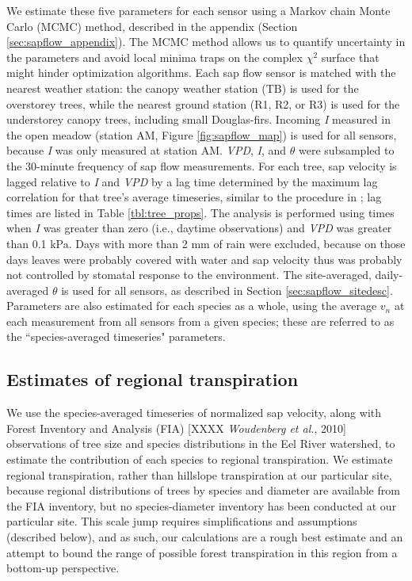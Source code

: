 We estimate these five parameters for each sensor using a Markov chain Monte Carlo (MCMC) method, described in the appendix (Section \ref{sec:sapflow_appendix}).  The MCMC method allows us to quantify uncertainty in the parameters and avoid local minima traps on the complex $\chi ^2$ surface that might hinder optimization algorithms.  Each sap flow sensor is matched with the nearest weather station: the canopy weather station (TB) is used for the overstorey trees, while the nearest ground station (R1, R2, or R3) is used for the understorey canopy trees, including small Douglas-firs.  Incoming \textit{I} measured in the open meadow (station AM, Figure \ref{fig:sapflow_map}) is used for all sensors, because \textit{I} was only measured at station AM.  \textit{VPD}, \textit{I}, and $\theta$ were subsampled to the 30-minute frequency of sap flow measurements.  For each tree, sap velocity is lagged relative to \textit{I} and \textit{VPD} by a lag time determined by the maximum lag correlation for that tree's average timeseries, similar to the procedure in \cite{dragoni2009decoupling}; lag times are listed in Table \ref{tbl:tree_props}.  The analysis is performed using times when \textit{I} was greater than zero (i.e., daytime observations) and \textit{VPD} was greater than 0.1 kPa.  Days with more than 2 mm of rain were excluded, because on those days leaves were probably covered with water and sap velocity thus was probably not controlled by stomatal response to the environment.  The site-averaged, daily-averaged $\theta$ is used for all sensors, as described in Section \ref{sec:sapflow_sitedesc}.  Parameters are also estimated for each species as a whole, using the average $v_n$ at each measurement from all sensors from a given species; these are referred to as the ``species-averaged timeseries" parameters.

\subsection{Estimates of regional transpiration}
\label{sec:sapflow_regmeth}
We use the species-averaged timeseries of normalized sap velocity, along with Forest Inventory and Analysis (FIA) [XXXX \textit{Woudenberg et al.}, 2010] observations of tree size and species distributions in the Eel River watershed, to estimate the contribution of each species to regional transpiration.  We estimate regional transpiration, rather than hillslope transpiration at our particular site, because regional distributions of trees by species and diameter are available from the FIA inventory, but no species-diameter inventory has been conducted at our particular site.  This scale jump requires simplifications and assumptions (described below), and as such, our calculations are a rough best estimate and an attempt to bound the range of possible forest transpiration in this region from a bottom-up perspective.  


